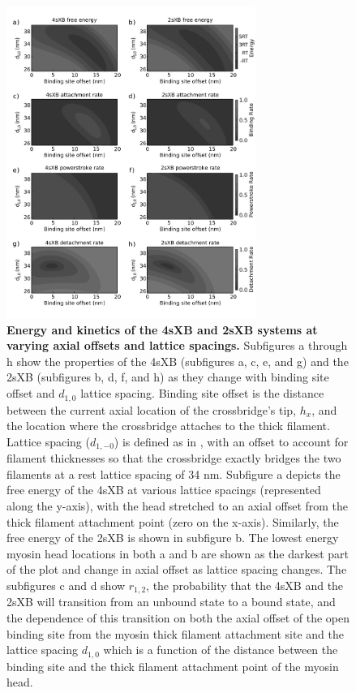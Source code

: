 \documentclass[]{article}
\begin{document}
\begin{figure}[htbp]
    \begin{center}
    \includegraphics[width=3.2in]{../imgs/Figure2.pdf}
    \caption{
        \label{fig_kinetics_contours}
        \textbf{Energy and kinetics of the 4sXB and 2sXB systems at varying axial offsets and lattice spacings.} 
        Subfigures a through h show the properties of the 4sXB (subfigures a, c, e, and g) and the 2sXB (subfigures b, d, f, and h) as they change with binding site offset and $d_{1,0}$ lattice spacing.
        Binding site offset is the distance between the current axial location of the crossbridge's tip, $h_x$, and the location where the crossbridge attaches to the thick filament.
        Lattice spacing ($d_{1,-0}$) is defined as in \citet{Millman:1998p1346}, with an offset to account for filament thicknesses so that the crossbridge exactly bridges the two filaments at a rest lattice spacing of 34 nm.
        Subfigure a depicts the free energy of the 4sXB at various lattice spacings (represented along the y-axis), with the head stretched to an axial offset from the thick filament attachment point (zero on the x-axis).
        Similarly, the free energy of the 2sXB is shown in subfigure b.
        The lowest energy myosin head locations in both a and b are shown as the darkest part of the plot and change in axial offset as lattice spacing changes.
        The subfigures c and d show $r_{1,2}$, the probability that the 4sXB and the 2sXB will transition from an unbound state to a bound state, and the dependence of this transition on both the axial offset of the open binding site from the myosin thick filament attachment site and the lattice spacing $d_{1,0}$ which is a function of the distance between the binding site and the thick filament attachment point of the myosin head. 
}
\end{center}
\end{figure}
\end{document}
